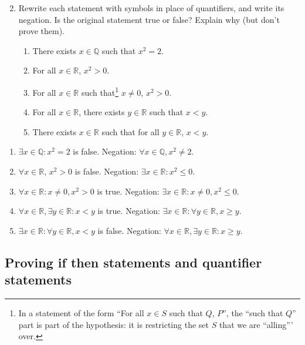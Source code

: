 \documentclass[12pt]{amsart}
\newcommand{\Q}{\mathbb{Q}}
\newcommand{\R}{{\mathbb{R}}}
\numberwithin{equation}{section}
\theoremstyle{plain} %
\theoremstyle{definition}
\theoremstyle{remark}
\begin{document}
\begin{enumerate}\setcounter{enumi}{1}
\item Rewrite each statement with symbols in place of quantifiers, and write its negation. Is the original statement true or false? Explain why (but don't prove them).
\begin{enumerate}
\item There exists $x\in \Q$ such that $x^2 = 2$.
\item For all $x\in \R$,  $x^2 >0$.
\item For all $x\in \R$ such that\footnote{In a statement of the form ``For all $x\in S$ such that $Q$, $P$'', the ``such that $Q$'' part is part of the hypothesis: it is restricting the set $S$ that we are ``alling''' over.} $x\neq 0$,  $x^2 >0$.
\item For all $x\in \R$, there exists $y\in \R$ such that $x<y$.
\item There exists $x\in \R$ such that for all $y\in \R$, $x<y$.
\end{enumerate}
\end{enumerate}

\begin{framed}
\begin{enumerate}
\item $\exists x\in \Q:x^2=2$ is false. Negation: $\forall x\in \Q, x^2\neq 2$.
\item $\forall x\in \R$, $x^2>0$ is false. Negation: $\exists x\in \R : x^2\leq 0$.
\item $\forall x\in \R: x\neq 0, x^2>0$ is true. Negation: $\exists x\in \R : x\neq 0, x^2\leq 0$.
\item $\forall x\in \R, \exists y\in \R: x<y$ is true. Negation: $\exists x\in \R: \forall y\in \R, x\geq y$.
\item $\exists x\in \R: \forall y\in \R, x< y$ is false. Negation: $\forall x\in \R, \exists y\in \R:  x\geq y$.
\end{enumerate}
\end{framed}

\subsection*{Proving if then statements and quantifier statements}
\end{document}
